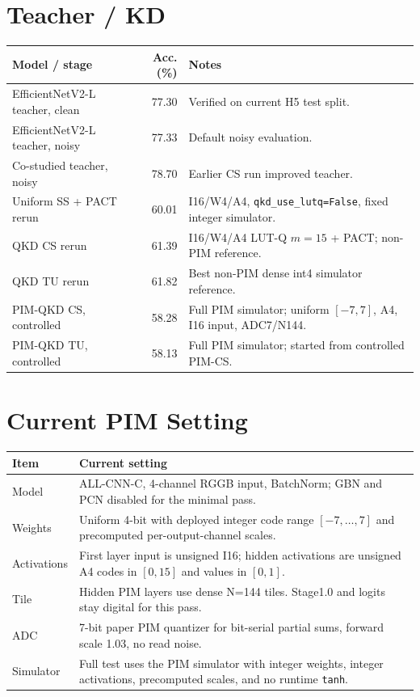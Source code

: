 \documentclass[10pt]{article}
\begin{document}
\section*{Teacher / KD}

\begin{table}[h]
\centering
\small
\begin{tabular}{@{}l r l@{}}
\toprule
Model / stage & Acc. (\%) & Notes \\
\midrule
EfficientNetV2-L teacher, clean & 77.30 & Verified on current H5 test split. \\
EfficientNetV2-L teacher, noisy & 77.33 & Default noisy evaluation. \\
Co-studied teacher, noisy & 78.70 & Earlier CS run improved teacher. \\
Uniform SS + PACT rerun & 60.01 & I16/W4/A4, \texttt{qkd\_use\_lutq=False}, fixed integer simulator. \\
QKD CS rerun & 61.39 & I16/W4/A4 LUT-Q $m=15$ + PACT; non-PIM reference. \\
QKD TU rerun & 61.82 & Best non-PIM dense int4 simulator reference. \\
PIM-QKD CS, controlled & 58.28 & Full PIM simulator; uniform $[-7,7]$, A4, I16 input, ADC7/N144. \\
PIM-QKD TU, controlled & 58.13 & Full PIM simulator; started from controlled PIM-CS. \\
\bottomrule
\end{tabular}
\end{table}

\section*{Current PIM Setting}

\begin{table}[h]
\centering
\small
\begin{tabularx}{\linewidth}{@{}l X@{}}
\toprule
Item & Current setting \\
\midrule
Model & ALL-CNN-C, 4-channel RGGB input, BatchNorm; GBN and PCN disabled for the minimal pass. \\
Weights & Uniform 4-bit with deployed integer code range $[-7,\ldots,7]$ and precomputed per-output-channel scales. \\
Activations & First layer input is unsigned I16; hidden activations are unsigned A4 codes in $[0,15]$ and values in $[0,1]$. \\
Tile & Hidden PIM layers use dense N=144 tiles. Stage1.0 and logits stay digital for this pass. \\
ADC & 7-bit paper PIM quantizer for bit-serial partial sums, forward scale 1.03, no read noise. \\
Simulator & Full test uses the PIM simulator with integer weights, integer activations, precomputed scales, and no runtime \texttt{tanh}. \\
\bottomrule
\end{tabularx}
\end{table}
\end{document}
